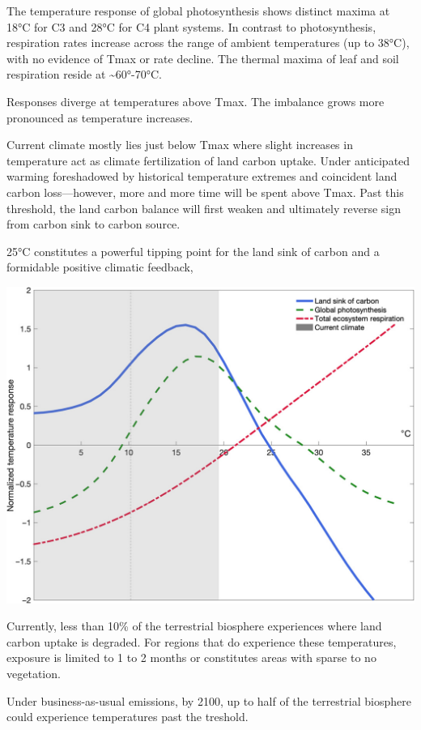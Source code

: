 \documentclass[
]{book}
\begin{document}
The temperature response of global photosynthesis
shows distinct maxima at 18°C for C3 and 28°C for C4 plant systems.
In contrast to photosynthesis, respiration rates increase across
the range of ambient temperatures (up to 38°C),
with no evidence of Tmax or rate decline.
The thermal maxima of leaf and soil respiration reside at \textasciitilde60°-70°C.

Responses diverge at temperatures above Tmax.
The imbalance grows more pronounced as temperature increases.

Current climate mostly lies just below Tmax where slight increases in temperature act as
climate fertilization of land carbon uptake.
Under anticipated warming foreshadowed by historical temperature extremes and coincident
land carbon loss---however, more and more time will be spent above Tmax.
Past this threshold, the land carbon balance will first weaken and
ultimately reverse sign from carbon sink to carbon source.

25°C constitutes a powerful tipping point for the land
sink of carbon and a formidable positive climatic feedback,

\includegraphics{fig/Land_Sink_of_Carbon.jpg}

Currently, less than 10\% of the terrestrial biosphere experiences
where land carbon uptake is degraded.
For regions that do experience these temperatures,
exposure is limited to 1 to 2 months or
constitutes areas with sparse to no vegetation.

Under business-as-usual emissions, by 2100, up to half
of the terrestrial biosphere could experience temperatures past
the treshold.
\end{document}
